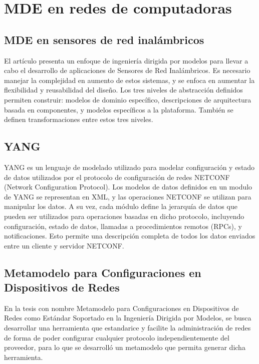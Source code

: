 \section{MDE en redes de computadoras}
\subsection{MDE en sensores de red inalámbricos}
El artículo \cite{essaadi2017mde} presenta un enfoque de ingeniería dirigida por modelos para llevar a cabo el desarrollo de aplicaciones de Sensores de Red Inalámbricos. Es necesario manejar la complejidad en aumento de estos sistemas, y se enfoca en aumentar la flexibilidad y reusabilidad del diseño.
Los tres niveles de abstracción definidos permiten construir: modelos de dominio específico, descripciones de arquitectura basada en componentes, y modelos específicos a la plataforma. También se definen transformaciones entre estos tres niveles.

\subsection{YANG}
YANG es un lenguaje de modelado utilizado para modelar configuración y estado de datos utilizados por el protocolo de configuración de redes NETCONF (Network Configuration Protocol).
Los modelos de datos definidos en un modulo de YANG se representan en XML, y las operaciones NETCONF se utilizan para manipular los datos.
A su vez, cada módulo define la jerarquía de datos que pueden ser utilizados para operaciones basadas en dicho protocolo, incluyendo configuración, estado de datos, llamadas a procedimientos remotos (RPCs), y notificaciones. Esto permite una descripción completa de todos los datos enviados entre un cliente y servidor NETCONF. \cite{bjorklund2010yang}

\subsection{Metamodelo para Configuraciones en Dispositivos de Redes}
En la tesis con nombre Metamodelo para Configuraciones en Dispositivos de Redes como Estándar Soportado en la Ingeniería Dirigida por Modelos, 
se busca desarrollar una herramienta que estandarice y facilite la administración de redes de forma de poder configurar cualquier protocolo independientemente del proveedor, para lo que se desarrolló un metamodelo que permita generar dicha herramienta.

